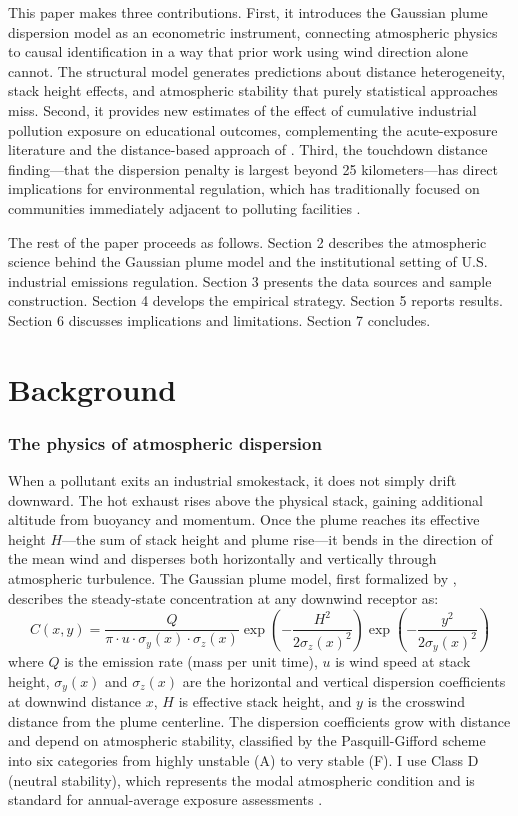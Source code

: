 \documentclass[12pt]{article}
\begin{document}
This paper makes three contributions. First, it introduces the Gaussian plume dispersion model as an econometric instrument, connecting atmospheric physics to causal identification in a way that prior work using wind direction alone cannot. The structural model generates predictions about distance heterogeneity, stack height effects, and atmospheric stability that purely statistical approaches miss. Second, it provides new estimates of the effect of cumulative industrial pollution exposure on educational outcomes, complementing the acute-exposure literature \citep{ebenstein2016} and the distance-based approach of \citet{persico2021}. Third, the touchdown distance finding---that the dispersion penalty is largest beyond 25 kilometers---has direct implications for environmental regulation, which has traditionally focused on communities immediately adjacent to polluting facilities \citep{currie2014}.

The rest of the paper proceeds as follows. Section 2 describes the atmospheric science behind the Gaussian plume model and the institutional setting of U.S. industrial emissions regulation. Section 3 presents the data sources and sample construction. Section 4 develops the empirical strategy. Section 5 reports results. Section 6 discusses implications and limitations. Section 7 concludes.

\section{Background}

\subsubsection*{The physics of atmospheric dispersion} When a pollutant exits an industrial smokestack, it does not simply drift downward. The hot exhaust rises above the physical stack, gaining additional altitude from buoyancy and momentum. Once the plume reaches its effective height $H$---the sum of stack height and plume rise---it bends in the direction of the mean wind and disperses both horizontally and vertically through atmospheric turbulence. The Gaussian plume model, first formalized by \citet{pasquill1961}, describes the steady-state concentration at any downwind receptor as:
\begin{equation}
C(x,y) = \frac{Q}{\pi \cdot u \cdot \sigma_y(x) \cdot \sigma_z(x)} \exp\left(-\frac{H^2}{2\sigma_z(x)^2}\right) \exp\left(-\frac{y^2}{2\sigma_y(x)^2}\right)
\label{eq:plume}
\end{equation}
where $Q$ is the emission rate (mass per unit time), $u$ is wind speed at stack height, $\sigma_y(x)$ and $\sigma_z(x)$ are the horizontal and vertical dispersion coefficients at downwind distance $x$, $H$ is effective stack height, and $y$ is the crosswind distance from the plume centerline. The dispersion coefficients grow with distance and depend on atmospheric stability, classified by the Pasquill-Gifford scheme into six categories from highly unstable (A) to very stable (F). I use Class D (neutral stability), which represents the modal atmospheric condition and is standard for annual-average exposure assessments \citep{turner1994}.
\end{document}
